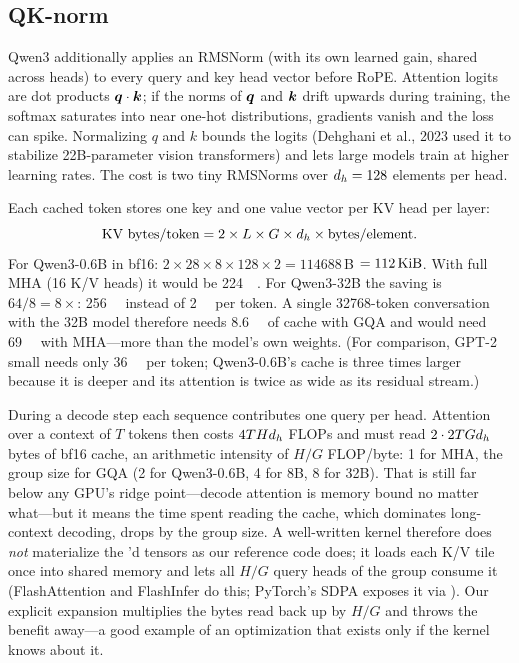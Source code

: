 \subsection{QK-norm}
Qwen3 additionally applies an RMSNorm (with its own learned gain, shared across heads) to every query
and key head vector before RoPE. Attention logits are dot products $\bm{q}\cdot\bm{k}$; if the norms
of $\bm{q}$ and $\bm{k}$ drift upwards during training, the softmax saturates into near one-hot
distributions, gradients vanish and the loss can spike. Normalizing $q$ and $k$ bounds the logits
(Dehghani et al., 2023 used it to stabilize 22B-parameter vision transformers) and lets large models
train at higher learning rates. The cost is two tiny RMSNorms over $d_{h}=128$ elements per head.

\begin{napkinmath}
Each cached token stores one key and one value vector per KV head per layer:
\[
\text{KV bytes/token} = 2\times L\times G\times d_{h}\times \text{bytes/element}.
\]
For Qwen3-0.6B in bf16: $2\times28\times8\times128\times2=\num{114688}$\,B $=\SI{112}{\kibi\byte}$.
With full MHA (16 K/V heads) it would be \SI{224}{\kibi\byte}. For Qwen3-32B the saving is
$64/8=8\times$: \SI{256}{\kibi\byte} instead of \SI{2}{\mebi\byte} per token. A single
\num{32768}-token conversation with the 32B model therefore needs \SI{8.6}{\giga\byte} of cache with
GQA and would need \SI{69}{\giga\byte} with MHA---more than the model's own weights. (For comparison,
GPT-2 small needs only \SI{36}{\kibi\byte} per token; Qwen3-0.6B's cache is three times larger because
it is deeper and its attention is twice as wide as its residual stream.)
\end{napkinmath}

\begin{systemslens}
During a decode step each sequence contributes one query per head. Attention over a context of $T$
tokens then costs $4T Hd_{h}$ FLOPs and must read $2\cdot2TGd_{h}$ bytes of bf16 cache, an
arithmetic intensity of $H/G$ FLOP/byte: 1 for MHA, the group size for GQA (2 for Qwen3-0.6B, 4 for
8B, 8 for 32B). That is still far below any GPU's ridge point---decode attention is memory bound no
matter what---but it means the time spent reading the cache, which dominates long-context decoding,
drops by the group size. A well-written kernel therefore does \emph{not} materialize the
'd tensors as our reference code does; it loads each K/V tile once into
shared memory and lets all $H/G$ query heads of the group consume it (FlashAttention and FlashInfer do
this; PyTorch's SDPA exposes it via ). Our explicit expansion multiplies the
bytes read back up by $H/G$ and throws the benefit away---a good example of an optimization that exists
only if the kernel knows about it.
\end{systemslens}

